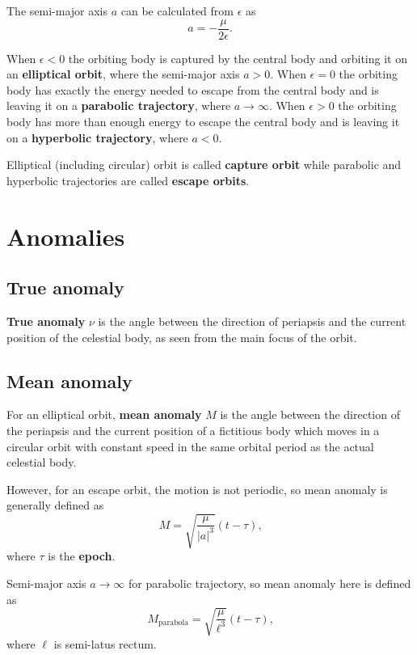 \documentclass{article}
\begin{document}
The semi-major axis $a$ can be calculated from $\epsilon$ as
\begin{equation}
  a = -\frac{\mu}{2 \epsilon}\text{.}
\end{equation}

When $\epsilon < 0$ the orbiting body is captured by the central body and orbiting it on
an \textbf{elliptical orbit}, where the semi-major axis $a > 0$.
When $\epsilon = 0$ the orbiting body has exactly the energy needed to escape from the
central body and is leaving it on a \textbf{parabolic trajectory},
where $a \to \infty$.
When $\epsilon > 0$ the orbiting body has more than enough energy to escape the central
body and is leaving it on a \textbf{hyperbolic trajectory}, where $a < 0$.

Elliptical (including circular) orbit is called \textbf{capture orbit}
while parabolic and hyperbolic trajectories are called \textbf{escape orbits}.

\section{Anomalies}
\subsection{True anomaly}
\textbf{True anomaly} $\nu$ is the angle between the direction of periapsis and the current
position of the celestial body, as seen from the main focus of the orbit.

\subsection{Mean anomaly}
For an elliptical orbit, \textbf{mean anomaly} $M$ is the angle between the direction of the
periapsis and the current position of a fictitious body which moves in a circular
orbit with constant speed in the same orbital period as the actual celestial body.

However, for an escape orbit, the motion is not periodic, so mean anomaly is generally
defined as
\begin{equation}
  M = \sqrt{\frac{\mu}{\vert a \vert ^3}}(t - \tau)\text{,}
  \label{equ:mean-anomaly}
\end{equation}
where $\tau$ is the \textbf{epoch}.

Semi-major axis $a \to \infty$ for parabolic trajectory, so mean anomaly here is defined as
\begin{equation}
  M_{\mathrm{parabola}} = \sqrt{\frac{\mu}{\ell^3}}(t - \tau)\text{,}
  \label{equ:mean-anomaly-parabola}
\end{equation}
where $\ell$ is semi-latus rectum.
\end{document}

